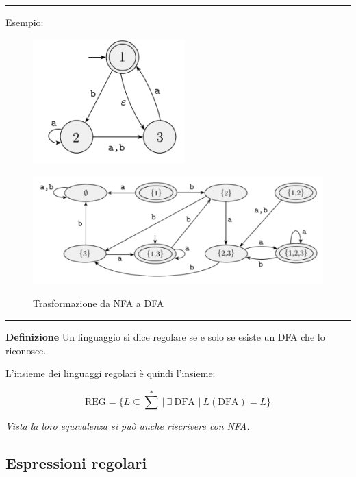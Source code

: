 \documentclass{article}
\begin{document}
\noindent\rule{\textwidth}{0.5pt}\newline

\noindent Esempio:\newline

\begin{figure}[ht]
    \centering
    \includegraphics[width=0.4\linewidth]{trans.png}
    
    \vspace{30pt}
    
    \includegraphics[width=\linewidth]{trans2.png}
    \label{fig:nfa_to_dfa}
    \caption{Trasformazione da NFA a DFA}
\end{figure}

\noindent\rule{\textwidth}{0.5pt}\newline

\noindent\textbf{Definizione} Un linguaggio si dice regolare se e solo se esiste un DFA che lo riconosce.\newline

\noindent L'insieme dei linguaggi regolari è quindi l'insieme:

$$\text{REG}=\{L\subseteq \text{${\sum}^*$}\ |\ \exists\ \text{DFA }|\ L(\text{DFA})=L\}$$

\noindent\textit{Vista la loro equivalenza si può anche riscrivere con NFA.}

\newpage

\subsection{Espressioni regolari}
\end{document}
